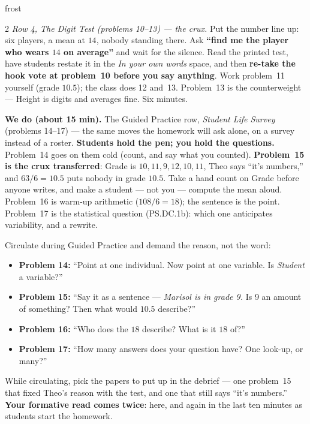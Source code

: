 \documentclass[10pt]{article}
\begin{document}
\begin{skillbox}{frost}
\begin{multicols}{2}
\emph{Row 4, The Digit Test (problems 10--13) --- the crux.} Put the number line up: six
players, a mean at $14$, nobody standing there. Ask \textbf{``find me the player who wears
$14$ on average''} and wait for the silence. Read the printed test, have students restate it
in the \emph{In your own words} space, and then \textbf{re-take the hook vote at problem~10
before you say anything}. Work problem~11 yourself (grade $10.5$); the class does 12 and~13.
Problem~13 is the counterweight --- Height is digits and averages fine. Six minutes.

\columnbreak
\textbf{We do (about 15 min).} The Guided Practice row, \emph{Student Life Survey} (problems
14--17) --- the same moves the homework will ask alone, on a survey instead of a roster.
\textbf{Students hold the pen; you hold the questions.} Problem~14 goes on them cold (count,
and say what you counted). \textbf{Problem~15 is the crux transferred}: Grade is $10, 11, 9,
12, 10, 11$, Theo says ``it's numbers,'' and $63/6 = 10.5$ puts nobody in grade $10.5$. Take a
hand count on Grade before anyone writes, and make a student --- not you --- compute the mean
aloud. Problem~16 is warm-up arithmetic ($108/6 = 18$); the sentence is the point. Problem~17
is the statistical question (PS.DC.1b): which one anticipates variability, and a rewrite.

Circulate during Guided Practice and demand the reason, not the word:
\begin{itemize}[leftmargin=1.1em, nosep]
  \item \textbf{Problem 14:} ``Point at one individual. Now point at one variable. Is
        \emph{Student} a variable?''
  \item \textbf{Problem 15:} ``Say it as a sentence --- \emph{Marisol is in grade 9.} Is 9 an
        amount of something? Then what would $10.5$ describe?''
  \item \textbf{Problem 16:} ``Who does the $18$ describe? What is it $18$ of?''
  \item \textbf{Problem 17:} ``How many answers does your question have? One look-up, or
        many?''
\end{itemize}
While circulating, pick the papers to put up in the debrief --- one problem~15 that fixed
Theo's reason with the test, and one that still says ``it's numbers.'' \textbf{Your formative
read comes twice}: here, and again in the last ten minutes as students start the homework.
\end{multicols}
\end{skillbox}
\end{document}
